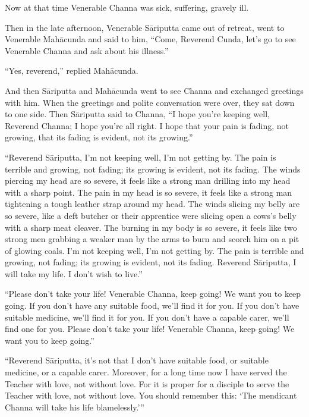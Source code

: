 \documentclass[12pt,openany]{book}%
\begin{document}
Now at that time Venerable Channa was sick, suffering, gravely ill. 

Then in the late afternoon, Venerable \textsanskrit{Sāriputta} came out of retreat, went to Venerable \textsanskrit{Mahācunda} and said to him, “Come, Reverend Cunda, let’s go to see Venerable Channa and ask about his illness.” 

“Yes, reverend,” replied \textsanskrit{Mahācunda}. 

And then \textsanskrit{Sāriputta} and \textsanskrit{Mahācunda} went to see Channa and exchanged greetings with him. When the greetings and polite conversation were over, they sat down to one side. Then \textsanskrit{Sāriputta} said to Channa, “I hope you’re keeping well, Reverend Channa; I hope you’re all right. I hope that your pain is fading, not growing, that its fading is evident, not its growing.” 

“Reverend \textsanskrit{Sāriputta}, I’m not keeping well, I’m not getting by. The pain is terrible and growing, not fading; its growing is evident, not its fading. The winds piercing my head are so severe, it feels like a strong man drilling into my head with a sharp point. The pain in my head is so severe, it feels like a strong man tightening a tough leather strap around my head. The winds slicing my belly are so severe, like a deft butcher or their apprentice were slicing open a cows’s belly with a sharp meat cleaver. The burning in my body is so severe, it feels like two strong men grabbing a weaker man by the arms to burn and scorch him on a pit of glowing coals. I’m not keeping well, I’m not getting by. The pain is terrible and growing, not fading; its growing is evident, not its fading. Reverend \textsanskrit{Sāriputta}, I will take my life. I don’t wish to live.” 

“Please don’t take your life! Venerable Channa, keep going! We want you to keep going. If you don’t have any suitable food, we’ll find it for you. If you don’t have suitable medicine, we’ll find it for you. If you don’t have a capable carer, we’ll find one for you. Please don’t take your life! Venerable Channa, keep going! We want you to keep going.” 

“Reverend \textsanskrit{Sāriputta}, it’s not that I don’t have suitable food, or suitable medicine, or a capable carer. Moreover, for a long time now I have served the Teacher with love, not without love. For it is proper for a disciple to serve the Teacher with love, not without love. You should remember this: ‘The mendicant Channa will take his life blamelessly.’” 
\end{document}
